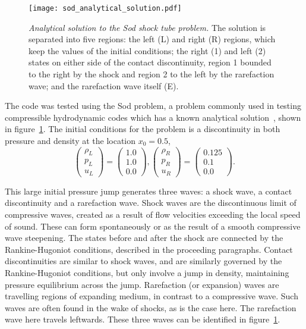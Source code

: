 \begin{figure}[t]
  \centering
  \texttt{[image: sod\_analytical\_solution.pdf]}
  \caption{\emph{Analytical solution to the Sod shock tube problem.} The solution is separated into five regions: the left (L) and right (R) regions, which keep the values of the initial conditions; the right (1) and left (2) states on either side of the contact discontinuity, region 1 bounded to the right by the shock and region 2 to the left by the rarefaction wave; and the rarefaction wave itself (E).}%
  \label{fig:sod_analytical_solution}
\end{figure}

The code was tested using the Sod problem, a problem commonly used in testing compressible hydrodynamic codes which has a known analytical solution~\cite{sodSurveySeveralFinite1978}, shown in figure~\ref{fig:sod_analytical_solution}. The initial conditions for the problem is a discontinuity in both pressure and density at the location $x_0=0.5$,
\begin{equation}
  \label{eq:sod_problem_ic}
\begin{pmatrix}\rho _{L}\\p_{L}\\u_{L}\end{pmatrix}
=
\begin{pmatrix}1.0\\1.0\\0.0\end{pmatrix},
\begin{pmatrix}\rho _{R}\\p_{R}\\u_{R}\end{pmatrix}
=
\begin{pmatrix}0.125\\0.1\\0.0\end{pmatrix}.
\end{equation}

This large initial pressure jump generates three waves: a shock wave, a contact discontinuity and a rarefaction wave. Shock waves are the discontinuous limit of compressive waves, created as a result of flow velocities exceeding the local speed of sound. These can form spontaneously or as the result of a smooth compressive wave steepening. The states before and after the shock are connected by the Rankine-Hugoniot conditions, described in the proceeding paragraphs. Contact discontinuities are similar to shock waves, and are similarly governed by the Rankine-Hugoniot conditions, but only involve a jump in density, maintaining pressure equilibrium across the jump. Rarefaction (or expansion) waves are travelling regions of expanding medium, in contrast to a compressive wave. Such waves are often found in the wake of shocks, as is the case here. The rarefaction wave here travels leftwards. These three waves can be identified in figure~\ref{fig:sod_analytical_solution}.


